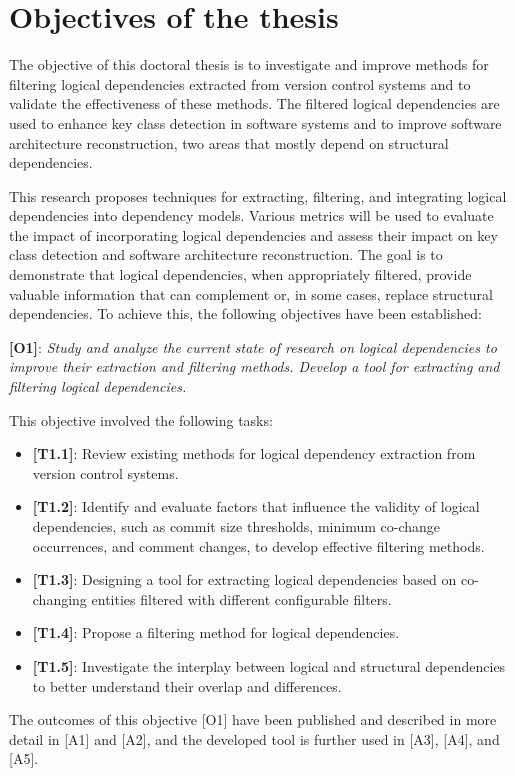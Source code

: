 \section{Objectives of the thesis}

\hspace{4em}The objective of this doctoral thesis is to investigate and improve methods for filtering logical dependencies extracted from version control systems and to validate the effectiveness of these methods. The filtered logical dependencies are used to enhance key class detection in software systems and to improve software architecture reconstruction, two areas that mostly depend on structural dependencies.

This research proposes techniques for extracting, filtering, and integrating logical dependencies into dependency models. Various metrics will be used to evaluate the impact of incorporating logical dependencies and assess their impact on key class detection and software architecture reconstruction. The goal is to demonstrate that logical dependencies, when appropriately filtered, provide valuable information that can complement or, in some cases, replace structural dependencies.
To achieve this, the following objectives have been established:

\textbf{[O1]}: \textit{Study and analyze the current state of research on logical dependencies to improve their extraction and filtering methods. Develop a tool for extracting and filtering logical dependencies.}

This objective involved the following tasks:
\begin{itemize}
\item \textbf{[T1.1]}: Review existing methods for logical dependency extraction from version control systems.
\item \textbf{[T1.2]}: Identify and evaluate factors that influence the validity of logical dependencies, such as commit size thresholds, minimum co-change occurrences, and comment changes, to develop effective filtering methods.
\item \textbf{[T1.3]}: Designing a tool for extracting logical dependencies based on co-changing entities filtered with different configurable filters.
\item \textbf{[T1.4]}: Propose a filtering method for logical dependencies.
\item \textbf{[T1.5]}: Investigate the interplay between logical and structural dependencies to better understand their overlap and differences.
\end{itemize}
The outcomes of this objective [O1] have been published and described in more detail in [A1] and [A2], and the developed tool is further used in [A3], [A4], and [A5].


